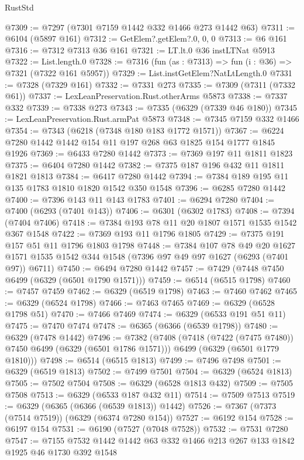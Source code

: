 \begin{lexlean}{RustStd}
\begin{coremodule}
{{@7309 := @7297 (@7301 @7159 @1442 @332 @1466 @273 @1442 @63)
@7311 := @6104 (@5897 @161)
@7312 := GetElem?.getElem?.{0, 0, 0}
@7313 := @6 @161
@7316 := @7312 @7313 @36 @161
@7321 := LT.lt.{0} @36 instLTNat @5913
@7322 := List.length.{0}
@7328 := @7316 (fun (as : @7313) => fun (i : @36) => @7321 (@7322 @161 @5957))
@7329 := List.instGetElem?NatLtLength.{0}
@7331 := @7328 (@7329 @161)
@7332 := @7331 @273
@7335 := @7309 (@7311 (@7332 @61))
@7337 := LexLeanPreservation.Rust.otherArms @5873
@7338 := @7337 @332
@7339 := @7338 @273
@7343 := @7335 (@6329 (@7339 @46 @180))
@7345 := LexLeanPreservation.Rust.armPat @5873
@7348 := @7345 @7159 @332 @1466
@7354 := @7343 (@6218 (@7348 @180 @183 @1772 @1571))
@7367 := @6224 @7280 @1442 @1442 @154 @11 @197 @268 @63 @1825 @154 @1777 @1845 @1926
@7369 := @6433 @7280 @1442
@7373 := @7369 @197 @11 @1811 @1823
@7375 := @6404 @7280 @1442
@7382 := @7375 @187 @196 @432 @11 @1811 @1821 @1813
@7384 := @6417 @7280 @1442
@7394 := @7384 @189 @195 @11 @135 @1783 @1810 @1820 @1542 @350 @1548
@7396 := @6285 @7280 @1442
@7400 := @7396 @143 @11 @143 @1783
@7401 := @6294 @7280
@7404 := @7400 (@6293 (@7401 @143))
@7406 := @6301 (@6302 @1783)
@7408 := @7394 (@7404 @7406)
@7418 := @7384 @193 @78 @11 @20 @1807 @1571 @1535 @1542 @367 @1548
@7422 := @7369 @193 @11 @1796 @1805
@7429 := @7375 @191 @157 @51 @11 @1796 @1803 @1798
@7448 := @7384
    @107
    @78
    @49
    @20
    @1627
    @1571
    @1535
    @1542
    @344
    @1548
    (@7396 @97 @49 @97 @1627 (@6293 (@7401 @97)) @6711)
@7450 := @6494 @7280 @1442
@7457 := @7429 (@7448 @7450 @6499 (@6329 (@6501 @1790 @1571)))
@7459 := @6514 (@6515 @1798)
@7460 := @7457 @7459
@7462 := @6329 (@6519 @1798)
@7463 := @7460 @7462
@7465 := @6329 (@6524 @1798)
@7466 := @7463 @7465
@7469 := @6329 (@6528 @1798 @51)
@7470 := @7466 @7469
@7474 := @6329 (@6533 @191 @51 @11)
@7475 := @7470 @7474
@7478 := @6365 (@6366 (@6539 @1798))
@7480 := @6329 (@7478 @1442)
@7496 := @7382
    (@7408
      (@7418 (@7422 (@7475 @7480)) @7450 @6499 (@6329 (@6501 @1786 @1571)))
      @6499
      (@6329 (@6501 @1779 @1810)))
@7498 := @6514 (@6515 @1813)
@7499 := @7496 @7498
@7501 := @6329 (@6519 @1813)
@7502 := @7499 @7501
@7504 := @6329 (@6524 @1813)
@7505 := @7502 @7504
@7508 := @6329 (@6528 @1813 @432)
@7509 := @7505 @7508
@7513 := @6329 (@6533 @187 @432 @11)
@7514 := @7509 @7513
@7519 := @6329 (@6365 (@6366 (@6539 @1813)) @1442)
@7526 := @7367 (@7373 (@7514 @7519)) (@6329 (@6374 @7280 @154))
@7527 := @6192 @154
@7528 := @6197 @154
@7531 := @6190 (@7527 (@7048 @7528))
@7532 := @7531 @7280
@7547 := @7155 @7532 @1442 @1442 @63 @332 @1466 @213 @267 @133 @1842 @1925 @46 @1730 @392 @1548
}}
\end{coremodule}
\end{lexlean}
